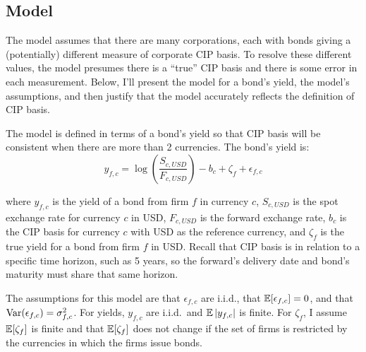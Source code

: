


\subsection{Model} \label{corp_cip_model}

The model assumes that there are many corporations, each with bonds giving a (potentially) different measure of corporate CIP basis.  To resolve these different values, the model presumes there is a ``true'' CIP basis and there is some error in each measurement.  Below, I'll present the model for a bond's yield, the model's assumptions, and then justify that the model accurately reflects the definition of CIP basis.

The model is defined in terms of a bond's yield so that CIP basis will be consistent when there are more than 2 currencies.  The bond's yield is:
\begin{equation}
  \label{first_model}
 y_{f,c} = \log\left(\frac{S_{c,USD}}{F_{c,USD}}\right) - b_{c} + \zeta_{f} + \epsilon_{f,c} 
\end{equation}


\noindent where $y_{f,c}$ is the yield of a bond from firm $f$ in currency $c$, $S_{c,USD}$ is the spot exchange rate for currency $c$ in USD, $F_{c,USD}$ is the forward exchange rate, $b_{c}$ is the CIP basis for currency $c$ with USD as the reference currency, and $\zeta_{f}$ is the true yield for a bond from firm $f$ in USD.  Recall that CIP basis is in relation to a specific time horizon, such as 5 years, so the forward's delivery date and bond's maturity must share that same horizon.

The assumptions for this model are that $\epsilon_{f,c}$ are i.i.d., that $\operatorname{\mathbb{E}}[\epsilon_{f,c}] = 0$, and that $\operatorname{\mathrm{Var}}(\epsilon_{f,c}) = \sigma_{f,c}^2$.  For yields, $y_{f,c}$ are i.i.d.\ and $\operatorname{\mathbb{E}}|y_{f,c}|$ is finite.  For $\zeta_f$, I assume $\operatorname{\mathbb{E}}[\zeta_f]$ is finite and that $\operatorname{\mathbb{E}}[\zeta_f]$ does not change if the set of firms is restricted by the currencies in which the firms issue bonds.

